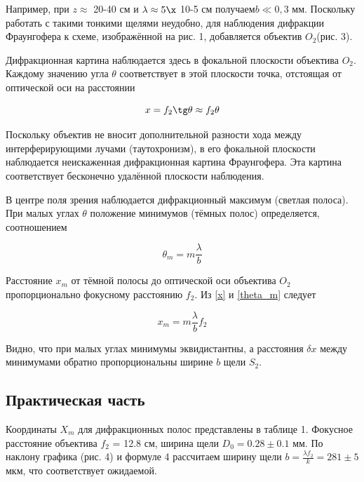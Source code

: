 \documentclass[a4paper, 12pt]{article}
\begin{document}
Например, при $ z \approx $ 20-40 см и $  \lambda \approx 5 \x $ 10-5  см получаем$  b \ll 0,3 $ мм. Поскольку работать с такими тонкими щелями неудобно, для наблюдения дифракции Фраунгофера к схеме, изображённой на рис. 1, добавляется объектив $ O_2  $(рис. 3).

Дифракционная картина наблюдается здесь в фокальной плоскости
объектива $ O_2 $. Каждому значению угла $ \theta $ соответствует в этой плоскости точка, отстоящая от оптической оси на расстоянии

\begin{equation}\label{x}
x = f_2 \tg \theta \approx f_2 \theta
\end{equation}

Поскольку объектив не вносит дополнительной разности хода
между интерферирующими лучами (таутохронизм), в его фокальной
плоскости наблюдается неискаженная дифракционная картина Фраунгофера. Эта картина соответствует бесконечно удалённой плоскости
наблюдения.

В центре поля зрения наблюдается дифракционный максимум (светлая полоса). При малых углах $ \theta $ положение минимумов (тёмных полос)
определяется, соотношением

\begin{equation}\label{theta_m}
\theta_m = m \dfrac{\lambda}{b}
\end{equation}

Расстояние $ x_m $ от тёмной полосы до оптической оси объектива $ O_2 $ пропорционально фокусному расстоянию $ f_2 $. Из \eqref{x} и \eqref{theta_m} следует 

\begin{equation}\label{xm}
x_m = m \dfrac{\lambda}{b} f_2
\end{equation}

Видно, что при малых углах минимумы эквидистантны, а
расстояния $ \delta x $ между минимумами обратно пропорциональны ширине $ b $ щели $ S_2 $.

\subsection{Практическая часть}
Координаты $X_m$ для дифракционных полос представлены в таблице 1. Фокусное расстояние объектива $f_2$ = 12.8 см, ширина щели $D_0 = 0.28 \pm 0.1$ мм. По наклону графика (рис. 4) и формуле 4 рассчитаем ширину щели $b = \frac{\lambda f_2}{k} = 281 \pm 5$ мкм, что соответствует ожидаемой.
\end{document}
